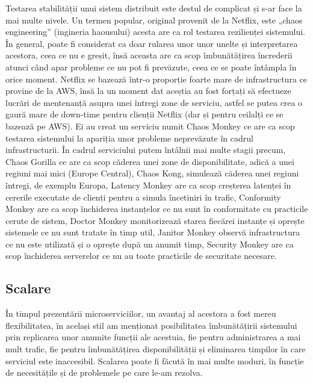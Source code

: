 Testarea stabilității unui sistem distribuit este destul de complicat și s-ar face la mai multe nivele.
Un termen popular, original provenit de la Netflix, este „chaos engineering” (ingineria haousului)
acesta are ca rol testarea rezilienței sistemului. În general, poate fi considerat
ca doar rularea unor unor unelte și interpretarea acestora, ceea ce nu e greșit, însă
aceasta are ca scop îmbunătățirea încrederii atunci când apar probleme ce nu pot fi
prevăzute, ceea ce se poate întâmpla în orice moment. Netflix se bazează într-o proporție
foarte mare de infrastructura ce provine de la AWS, însă la un moment dat aceștia au fost
forțați să efectueze lucrări de mentenanță asupra unei întregi zone de serviciu, astfel
se putea crea o gaură mare de down-time pentru clienții Netflix (dar și pentru ceilalți ce se
bazează pe AWS). Ei au creat un serviciu numit Chaos Monkey ce are ca scop testarea sistemului
la apariția unor probleme neprevăzute în cadrul infrastructurii. În cadrul serviciului
putem întâlnii mai multe stagii precum, Chaos Gorilla ce are ca scop căderea unei zone de disponibilitate,
adică a unei regiuni mai mici (Europe Central), Chaos Kong, simulează căderea unei regiuni întregi,
de exemplu Europa, Latency Monkey are ca scop creșterea latenței în cererile executate
de clienți pentru a simula încetiniri în trafic, Conformity Monkey are ca scop
închiderea instanțelor ce nu sunt în conformitate cu practicile cerute de sistem,
Doctor Monkey monitorizează starea fiecărei instanțe și oprește sistemele ce nu sunt tratate în timp util,
Janitor Monkey observă infrastructura ce nu este utilizată și o oprește după un anumit timp,
Security Monkey are ca scop închiderea serverelor ce nu au toate practicile de securitate
necesare.

\subsection{Scalare}

În timpul prezentării microserviciilor, un avantaj al acestora a fost mereu flexibilitatea,
în același stil am menționat posibilitatea îmbunătățirii sistemului prin replicarea unor
anumite funcții ale acestuia, fie pentru administrarea a mai mult trafic, fie pentru
îmbunătățirea disponibilității și eliminarea timpilor în care serviciul este inaccesibil.
Scalarea poate fi făcută în mai multe moduri, în funcție de necesitățile și de problemele
pe care le-am rezolva.

